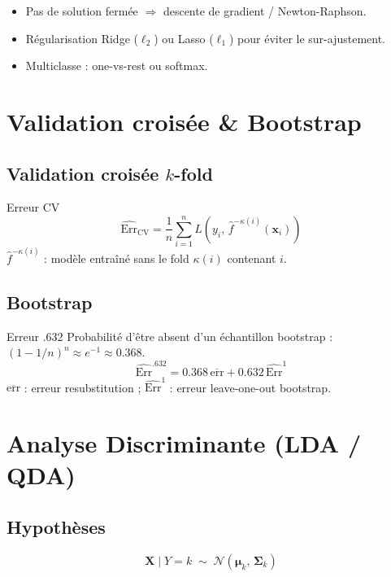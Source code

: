 \documentclass[10pt,a4paper,twocolumn]{article}
\begin{document}
\begin{itemize}[leftmargin=*,itemsep=1pt]
  \item Pas de solution fermée $\Rightarrow$ descente de gradient / Newton-Raphson.
  \item Régularisation Ridge ($\ell_2$) ou Lasso ($\ell_1$) pour éviter le sur-ajustement.
  \item Multiclasse : one-vs-rest ou softmax.
\end{itemize}

\section{Validation croisée \& Bootstrap}

\subsection{Validation croisée $k$-fold}
\begin{formulebox}{Erreur CV}
\[
\widehat{\text{Err}}_{\text{CV}} = \frac{1}{n}\sum_{i=1}^n L\!\left(y_i,\, \hat{f}^{-\kappa(i)}(\mathbf{x}_i)\right)
\]
$\hat{f}^{-\kappa(i)}$ : modèle entraîné sans le fold $\kappa(i)$ contenant $i$.
\end{formulebox}

\subsection{Bootstrap}
\begin{formulebox}{Erreur .632}
Probabilité d'être absent d'un échantillon bootstrap : $(1-1/n)^n \approx e^{-1} \approx 0.368$.
\[
\widehat{\text{Err}}^{.632} = 0.368\,\overline{\text{err}} + 0.632\,\widehat{\text{Err}}^1
\]
$\overline{\text{err}}$ : erreur resubstitution ; $\widehat{\text{Err}}^1$ : erreur leave-one-out bootstrap.
\end{formulebox}

\section{Analyse Discriminante (LDA / QDA)}

\subsection{Hypothèses}
\[
\mathbf{X}\mid Y=k \;\sim\; \mathcal{N}(\bm{\mu}_k,\, \bm{\Sigma}_k)
\]
\end{document}
